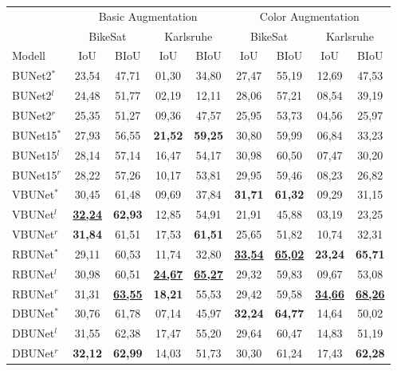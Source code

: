 \begin{table}[ht]
	\centering
	\begin{tabular}{l|cc|cc|cc|cc}
		& \multicolumn{4}{c|}{Basic Augmentation} & \multicolumn{4}{c}{Color Augmentation} \\
        & \multicolumn{2}{c|}{BikeSat} & \multicolumn{2}{c|}{Karlsruhe} & \multicolumn{2}{c|}{BikeSat} & \multicolumn{2}{c}{Karlsruhe} \\
		Modell & \ac{IoU} & \ac{BIoU} & \ac{IoU} & \ac{BIoU} & \ac{IoU} & \ac{BIoU} & \ac{IoU} & \ac{BIoU} \\
		\toprule
        BUNet2$^*$ & 23,54 & 47,71 & 01,30 & 34,80 &  27,47 & 55,19 & 12,69 & 47,53 \\
        BUNet2$^l$ & 24,48 & 51,77 & 02,19 & 12,11 &  28,06 & 57,21 & 08,54 & 39,19 \\
        BUNet2$^r$ & 25,35 & 51,27 & 09,36 & 47,57 &  25,95 & 53,73 & 04,56 & 25,97 \\
		\midrule

        BUNet15$^*$ & 27,93 & 56,55 & \textbf{21,52} & \textbf{59,25} &  30,80 & 59,99 & 06,84 & 33,23 \\
        BUNet15$^l$ & 28,14 & 57,14 & 16,47 & 54,17 &  30,98 & 60,50 & 07,47 & 30,20 \\
        BUNet15$^r$ & 28,22 & 57,26 & 10,17 & 53,81 &  29,95 & 59,46 & 08,23 & 26,82 \\
		\midrule

        VBUNet$^*$ & 30,45 & 61,48 & 09,69 & 37,84 &  \textbf{31,71} & \textbf{61,32} & 09,29 & 31,15 \\
        VBUNet$^l$ & \underline{\textbf{32,24}} & \textbf{62,93} & 12,85 & 54,91 &  21,91 & 45,88 & 03,19 & 23,25 \\
        VBUNet$^r$ & \textbf{31,84} & 61,51 & 17,53 & \textbf{61,51} &  25,65 & 51,82 & 10,74 & 32,31 \\
		\midrule

        RBUNet$^*$ & 29,11 & 60,53 & 11,74 & 32,80 &  \underline{\textbf{33,54}} & \underline{\textbf{65,02}} & \textbf{23,24} & \textbf{65,71} \\
        RBUNet$^l$ & 30,98 & 60,51 & \underline{\textbf{24,67}} & \underline{\textbf{65,27}} &  29,32 & 59,83 & 09,67 & 53,08 \\
        RBUNet$^r$ & 31,31 & \underline{\textbf{63,55}} & \textbf{18,21} & 55,53 &  29,42 & 59,58 & \underline{\textbf{34,66}} & \underline{\textbf{68,26}} \\
		\midrule

        DBUNet$^*$ & 30,76 & 61,78 & 07,14 & 45,97 &  \textbf{32,24} & \textbf{64,77} & 14,64 & 50,02 \\
        DBUNet$^l$ & 31,55 & 62,38 & 17,47 & 55,20 &  29,64 & 60,47 & 14,83 & 51,19 \\
        DBUNet$^r$ & \textbf{32,12} & \textbf{62,99} & 14,03 & 51,73 &  30,30 & 61,24 & 17,43 & \textbf{62,28} \\
        

\end{tabular}
\end{table}
